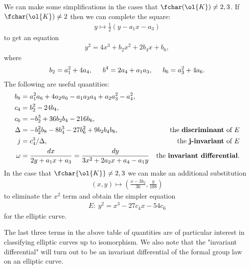 We can make some simplifications in the cases that $\fchar(\ol{K}) \neq 2,3$. If $\fchar(\ol{K}) \neq 2$ then we can complete the square:
\begin{align*}
	y \mapsto \frac{1}{2}(y - a_1x - a_3)
\end{align*}
to get an equation
\begin{align*}
	y^2 = 4x^3 + b_2x^2 + 2b_4x + b_6,
\end{align*}
where
\begin{align*}
	b_2 = a_1^2 + 4a_4,\hspace{1.5em} b^4 = 2a_4+a_1a_3,\hspace{1.5em} b_6 = a_3^2+4a_6.
\end{align*}
The following are useful quantities:
\begin{align*}
	b_8 &= a_1^2a_6+4a_2a_6-a_1a_3a_4+a_2a_3^2-a_4^2, & \\
	c_4 &= b_2^2 - 24b_4, & \\
	c_6 &= -b_2^3+36b_2b_4 - 216b_6, & \\
	\Delta &= -b_2^2b_8-8b_4^3-27b_6^2+9b_2b_4b_6, & \text{the \textbf{discriminant} of $E$} \\
	j &= c_4^3/\Delta, &\text{the \textbf{j-invariant} of $E$} \\
	\omega &= \frac{dx}{2y+a_1x+a_3} = \frac{dy}{3x^2+2a_2x+a_4-a_1y} &\text{the \textbf{invariant differential}}.
\end{align*}
In the case that $\fchar{\ol{K}} \neq 2,3$ we can make an additional substitution
\begin{align*}
	(x,y) \mapsto \left(\frac{x - 3b_2}{36}, \frac{y}{108}\right)
\end{align*}
to eliminate the $x^2$ term and obtain the simpler equation
\begin{align*}
	E:~y^2 = x^3 - 27c_4x-54c_6
\end{align*}
for the elliptic curve.

The last three terms in the above table of quantities are of particular interest in classifying elliptic curves up to isomorphism. We also note that the "invariant differential" will turn out to be an invariant differential of the formal group law on an elliptic curve.









